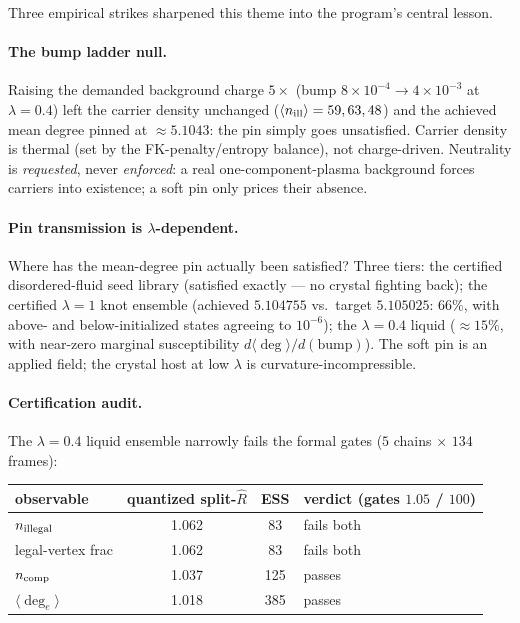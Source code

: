 \documentclass[11pt]{article}
\begin{document}
Three empirical strikes sharpened this theme into the program's central
lesson.

\paragraph{The bump ladder null.} Raising the demanded background charge
$5\times$ (bump $8\times10^{-4} \to 4\times10^{-3}$ at $\lambda=0.4$) left
the carrier density unchanged ($\langle n_{\rm ill}\rangle = 59, 63, 48$)
and the achieved mean degree pinned at $\approx 5.1043$: the pin simply goes
unsatisfied. Carrier density is thermal (set by the FK-penalty/entropy
balance), not charge-driven. Neutrality is \emph{requested}, never
\emph{enforced}: a real one-component-plasma background forces carriers into
existence; a soft pin only prices their absence.

\paragraph{Pin transmission is $\lambda$-dependent.} Where has the mean-degree
pin actually been satisfied? Three tiers: the certified disordered-fluid
seed library (satisfied exactly --- no crystal fighting back); the certified
$\lambda=1$ knot ensemble (achieved $5.104755$ vs.\ target $5.105025$:
$66\%$, with above- and below-initialized states agreeing to $10^{-6}$);
the $\lambda=0.4$ liquid ($\approx 15\%$, with near-zero marginal
susceptibility $d\langle\deg\rangle/d(\mathrm{bump})$). The soft pin is an
applied field; the crystal host at low $\lambda$ is curvature-incompressible.

\paragraph{Certification audit.} The $\lambda=0.4$ liquid ensemble narrowly
fails the formal gates ($5$ chains $\times$ $134$ frames):

\begin{center}
\begin{tabular}{lccl}
\toprule
observable & quantized split-$\hat R$ & ESS & verdict (gates $1.05$ / $100$) \\
\midrule
$n_{\rm illegal}$ & 1.062 & 83 & fails both \\
legal-vertex frac & 1.062 & 83 & fails both \\
$n_{\rm comp}$ & 1.037 & 125 & passes \\
$\langle \deg_e \rangle$ & 1.018 & 385 & passes \\
\bottomrule
\end{tabular}
\end{center}
\end{document}

